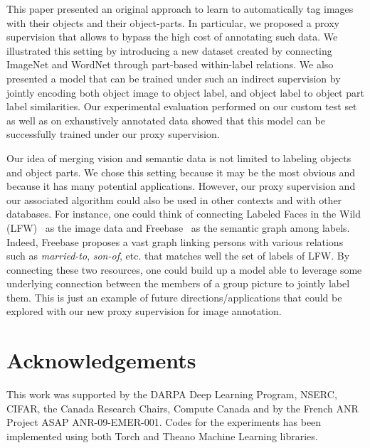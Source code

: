This paper presented an original approach to learn to automatically 
tag images with their objects and their object-parts.
%
In particular, we proposed a proxy supervision that allows to
bypass the high cost of annotating such data.
%
We illustrated this setting by introducing a new dataset created by
connecting  ImageNet and WordNet through part-based within-label
relations.
%
We also presented a model that can be trained under such an indirect
supervision by jointly encoding both object image to object label, and
object label to object part label similarities.
%
Our experimental evaluation performed on our custom test set as well
as on exhaustively annotated data showed that this model can be
successfully trained under our proxy supervision.

Our idea of merging vision and semantic data is not limited to
labeling objects and object parts.
%
We chose this setting because it may be the most obvious and
because it has many potential applications.
%
However, our proxy supervision and our associated algorithm could also
be used in other contexts and with other databases.
%
For instance, one could think of connecting Labeled Faces in the
Wild (LFW)~\citep{LFWTech} as the image data and Freebase~\citep{freebase} as
the semantic graph among labels.
%
Indeed, Freebase proposes a vast graph linking persons with various
relations such as {\it married-to}, {\it son-of}, etc. that matches
well the set of labels of LFW.
%
By connecting these two resources, one could build up a model able to
leverage some underlying connection between the members of a group picture
to jointly label them. 
%
This is just an example of future directions/applications that could
be explored with our new proxy supervision for image annotation.

\section{Acknowledgements}

This work was supported by the DARPA Deep Learning Program, NSERC, CIFAR, the
Canada Research Chairs, Compute Canada and by the French ANR Project ASAP
ANR-09-EMER-001. Codes for the experiments has been implemented using both
Torch \citep{collobert:2011c} and Theano \citep{bergstra+al:2010-scipy} Machine
Learning libraries.





